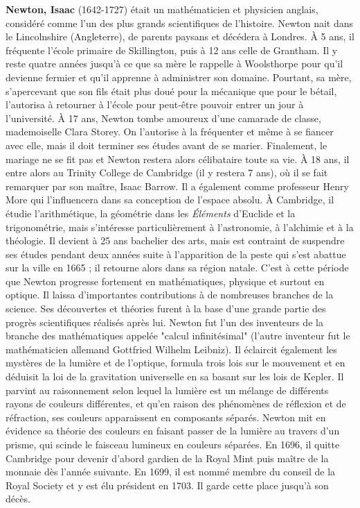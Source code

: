 \textbf{Newton, Isaac} (1642-1727) était un mathématicien et physicien anglais, considéré comme l'un des plus grands scientifiques de l'histoire. Newton nait dans le Lincolnshire (Angleterre), de parents paysans et décédera à Londres. À 5 ans, il fréquente l'école primaire de Skillington, puis à 12 ans celle de Grantham. Il y reste quatre années jusqu'à ce que sa mère le rappelle à Woolsthorpe pour qu'il devienne fermier et qu'il apprenne à administrer son domaine. Pourtant, sa mère, s'apercevant que son fils était plus doué pour la mécanique que pour le bétail, l'autorisa à retourner à l'école pour peut-être pouvoir entrer un jour à l'université. À 17 ans, Newton tombe amoureux d'une camarade de classe, mademoiselle Clara Storey. On l'autorise à la fréquenter et même à se fiancer avec elle, mais il doit terminer ses études avant de se marier. Finalement, le mariage ne se fit pas et Newton restera alors célibataire toute sa vie. À 18 ans, il entre alors au Trinity College de Cambridge (il y restera 7 ans), où il se fait remarquer par son maître, Isaac Barrow. Il a également comme professeur Henry More qui l'influencera dans sa conception de l'espace absolu. À Cambridge, il étudie l'arithmétique, la géométrie dans les \textit{Éléments} d'Euclide et la trigonométrie, mais s'intéresse particulièrement à l'astronomie, à l'alchimie et à la théologie. Il devient à 25 ans bachelier des arts, mais est contraint de suspendre ses études pendant deux années suite à l'apparition de la peste qui s'est abattue sur la ville en 1665 ; il retourne alors dans sa région natale. C'est à cette période que Newton progresse fortement en mathématiques, physique et surtout en optique. Il laissa d'importantes contributions à de nombreuses branches de la science. Ses découvertes et théories furent à la base d'une grande partie des progrès scientifiques réalisés après lui. Newton fut l'un des inventeurs de la branche des mathématiques appelée "calcul infinitésimal" (l'autre inventeur fut le mathématicien allemand Gottfried Wilhelm Leibniz). Il éclaircit également les mystères de la lumière et de l'optique, formula trois lois sur le mouvement et en déduisit la loi de la gravitation universelle en sa basant sur les lois de Kepler. Il parvint au raisonnement selon lequel la lumière est un mélange de différents rayons de couleurs différentes, et qu'en raison des phénomènes de réflexion et de réfraction, ses couleurs apparaissent en composants séparés. Newton mit en évidence sa théorie des couleurs en faisant passer de la lumière au travers d'un prisme, qui scinde le faisceau lumineux en couleurs séparées. En 1696, il quitte Cambridge pour devenir d'abord gardien de la Royal Mint puis maître de la monnaie dès l'année suivante. En 1699, il est nommé membre du conseil de la Royal Society et y est élu président en 1703. Il garde cette place jusqu'à son décès.

